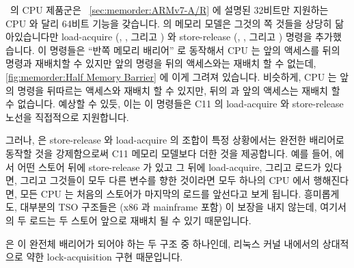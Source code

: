 \ARM\ 의  CPU 제품군은~\cite{ARMv8A:2017}
\cref{sec:memorder:ARMv7-A/R} 에 설명된 32비트만 지원하는 CPU 와 달리 64비트
기능을 갖습니다.
 의 메모리 모델은 그것의  쪽 것들을 상당히 닮아있습니다만
load-acquire (, , 그리고 ) 와 store-release
(, , 그리고 ) 명령을 추가했습니다.
이 명령들은 ``반쪽 메모리 배리어'' 로 동작해서  CPU 는 앞의 액세스를 뒤의
 명령과 재배치할 수 있지만 앞의  명령을 뒤의 액세스와는
재배치 할 수 없는데,
\cref{fig:memorder:Half Memory Barrier} 에 이게 그려져 있습니다.
비슷하게,  CPU 는 앞의  명령을 뒤따르는 액세스와 재배치 할 수
있지만, 뒤의  과 앞의 액세스는 재배치 할 수 없습니다.
예상할 수 있듯, 이는 이 명령들은 C11 의 load-acquire 와 store-release 노선을
직접적으로 지원합니다.

그러나,  은 store-release 와 load-acquire 의 조합이 특정 상황에서는
완전한 배리어로 동작할 것을 강제함으로써 C11 메모리 모델보다 더한 것을
제공합니다.
예를 들어,  에서 어떤 스토어 뒤에 store-release 가 있고 그 뒤에
load-acquire, 그리고 로드가 있다면, 그리고 그것들이 모두 다른 변수를 향한
것이라면 모두 하나의 CPU 에서 행해진다면, 모든 CPU 는 처음의 스토어가 마지막의
로드를 앞선다고 보게 됩니다.
흥미롭게도, 대부분의 TSO 구조들은 (x86 과 mainframe 포함) 이 보장을 내지
않는데, 여기서의 두 로드는 두 스토어 앞으로 재배치 될 수 있기 때문입니다.

 은  이 완전체 배리어가 되어야 하는 두 구조
중 하나인데, 리눅스 커널 내에서의 상대적으로 약한 lock-acquisition 구현
때문입니다.

